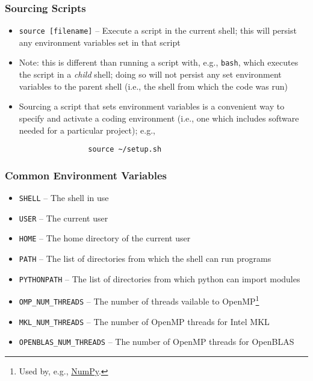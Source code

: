\documentclass[aspectratio=169]{beamer}
\begin{document}
\begin{frame}[fragile]
	\frametitle{Sourcing Scripts}
	\begin{itemize}
		\item \texttt{source [filename]} -- Execute a script in the current shell; this will persist any environment variables set in that script
		\item Note: this is different than running a script with, e.g., \texttt{bash}, which executes the script in a \emph{child} shell; doing so will not persist any set environment variables to the parent shell (i.e., the shell from which the code was run)
		\item Sourcing a script that sets environment variables is a convenient way to specify and activate a coding environment (i.e., one which includes software needed for a particular project); e.g.,
			\begin{verbatim}
				source ~/setup.sh
			\end{verbatim}
	\end{itemize}
\end{frame}

\begin{frame}
	\frametitle{Common Environment Variables}
	\begin{itemize}
		\item \texttt{SHELL} -- The shell in use
		\item \texttt{USER} -- The current user
		\item \texttt{HOME} -- The home directory of the current user
		\item \texttt{PATH} -- The list of directories from which the shell can run programs
		\item \texttt{PYTHONPATH} -- The list of directories from which python can import modules
		\item \texttt{OMP\_NUM\_THREADS} -- The number of threads vailable to OpenMP\footnote{Used by, e.g., \href{https://numpy.org/install/\#numpy-packages--accelerated-linear-algebra-libraries}{NumPy}.}
		\item \texttt{MKL\_NUM\_THREADS} -- The number of OpenMP threads for Intel MKL\footnotemark[\value{footnote}]
		\item \texttt{OPENBLAS\_NUM\_THREADS} -- The number of OpenMP threads for OpenBLAS\footnotemark[\value{footnote}]
	\end{itemize}
\end{frame}

\end{document}
